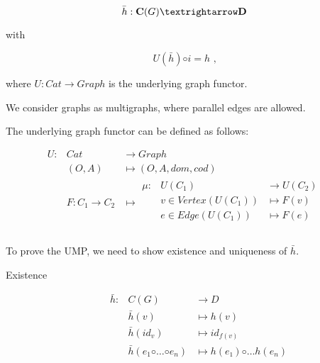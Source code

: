 \documentclass[notitlepage,a4paper]{article}
\begin{document}
\begin{enumerate}
{$$\bar{h} : \text{\bf C}(G) → \text{\bf D}$$

with

 $$U(\bar{h}) ◦ i = h\text{ ,}$$
 
where $U : Cat → Graph$ is the underlying graph functor.

}

    We consider graphs as multigraphs, where parallel edges are allowed.

    The underlying graph functor can be defined as follows:

    \begin{equation*}
    \begin{array}{rll}
    U : & Cat         & → Graph            \\
        & (O, A)      & \mapsto (O, A, dom, cod) \\
        & F : C_1 → C_2 & \mapsto
            \begin{array}{rll}
              μ : & U(C_1)       & → U(C_2)                 \\
                  & v ∈ Vertex(U(C_1))     & \mapsto F(v)                  \\
                  & e ∈ Edge(U(C_1))       & \mapsto F(e) \\ 
            \end{array}
            \\
    \end{array}
    \end{equation*}

    To prove the UMP, we need to show existence and uniqueness of $\bar{h}$.
    
    \begin{description}
      \item[Existence]

        \begin{equation*}
          \begin{array}{rll}
            \bar{h} : & C(G)    & → D                                     \\
                      & \bar{h}(v)                & \mapsto  h(v)               \\                
                      & \bar{h}(id_v)             & \mapsto  id_{f(v)}            \\                
                      & \bar{h}(e_1 ◦ … ◦ e_n)    & \mapsto  h(e₁) ◦ … h(e_n)    \\                
          \end{array}
        \end{equation*}


\end{description}
\end{enumerate}
\end{document}
